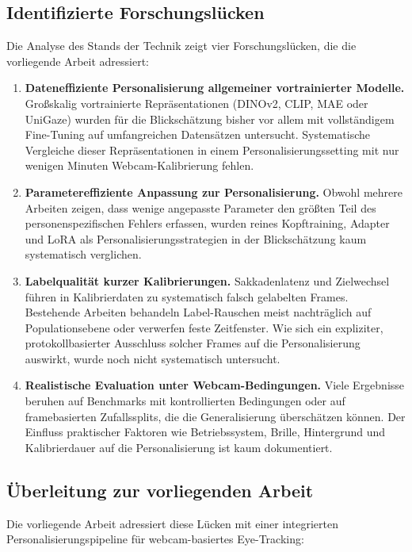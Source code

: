 \documentclass[
  11pt,
  a4paper,
  oneside,
  DIV=12,                 %
  BCOR=8mm,               %
  parskip=half,           %
  headings=normal,
  bibliography=totoc,     %
  listof=totoc            %
]{scrreprt}
\begin{document}
\subsection{Identifizierte Forschungslücken}
\label{subsec:luecken}
Die Analyse des Stands der Technik zeigt vier Forschungslücken, die die vorliegende Arbeit adressiert:

\begin{enumerate}[label=\textbf{F\arabic*:}, leftmargin=*, align=left]
  \item \textbf{Dateneffiziente Personalisierung allgemeiner vortrainierter Modelle.}
  Großskalig vortrainierte Repräsentationen (DINOv2, CLIP, MAE oder UniGaze) wurden für die Blickschätzung bisher vor allem mit vollständigem Fine-Tuning auf umfangreichen Datensätzen untersucht. Systematische Vergleiche dieser Repräsentationen in einem Personalisierungssetting mit nur wenigen Minuten Webcam-Kalibrierung fehlen.

  \item \textbf{Parametereffiziente Anpassung zur Personalisierung.}
  Obwohl mehrere Arbeiten zeigen, dass wenige angepasste Parameter den größten Teil des personenspezifischen Fehlers erfassen, wurden reines Kopftraining, Adapter und LoRA als Personalisierungsstrategien in der Blickschätzung kaum systematisch verglichen.

  \item \textbf{Labelqualität kurzer Kalibrierungen.}
  Sakkadenlatenz und Zielwechsel führen in Kalibrierdaten zu systematisch falsch gelabelten Frames. Bestehende Arbeiten behandeln Label-Rauschen meist nachträglich auf Populationsebene oder verwerfen feste Zeitfenster. Wie sich ein expliziter, protokollbasierter Ausschluss solcher Frames auf die Personalisierung auswirkt, wurde noch nicht systematisch untersucht.

  \item \textbf{Realistische Evaluation unter Webcam-Bedingungen.}
  Viele Ergebnisse beruhen auf Benchmarks mit kontrollierten Bedingungen oder auf framebasierten Zufallssplits, die die Generalisierung überschätzen können. Der Einfluss praktischer Faktoren wie Betriebssystem, Brille, Hintergrund und Kalibrierdauer auf die Personalisierung ist kaum dokumentiert.
\end{enumerate}

\subsection{Überleitung zur vorliegenden Arbeit}
\label{subsec:ueberleitung}
Die vorliegende Arbeit adressiert diese Lücken mit einer integrierten Personalisierungspipeline für webcam-basiertes Eye-Tracking:
\end{document}
